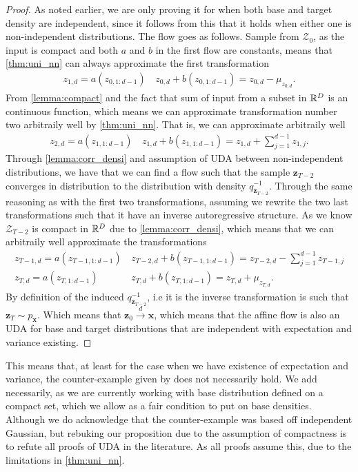 \begin{proof}
    As noted earlier, we are only proving it for when both base and target density are independent, since it follows from this that 
    it holds when either one is non-independent distributions. The flow goes as follows. Sample from \(\mathcal{Z}_0\), as the input
    is compact and both \(a\) and \(b\) in the first flow are constants, means that \cref{thm:uni_nn} can always approximate the
    first transformation
    \begin{align*}
        z_{1,d} = a(z_{0,1:d-1})&\,z_{0,d} + b(z_{0,1:d-1}) = z_{0,d} - \mu_{z_{0,d}}.
    \end{align*}
    From \cref{lemma:compact} and the fact that sum of input from a subset in \(\mathbb{R}^D\) is an continuous function, which means
    we can approximate transformation number two arbitraily well by \cref{thm:uni_nn}. That is, we can approximate 
    arbitraily well 
    \begin{align*}
        z_{2,d} = a(z_{1,1:d-1})&\,z_{1,d} + b(z_{1,1:d-1}) = z_{1,d} + \sum_{j=1}^{d-1} z_{1,j}.
    \end{align*}
    Through \cref{lemma:corr_densi} and assumption of UDA between non-independent distributions, we have that we 
    can find a flow such that the sample \(\bm z_{T-2}\) converges in distribution to the distribution with density \(q_{\bm z_{T-2}}^{-1}\).
    Through the same reasoning as with the first two transformations, assuming we rewrite the
    two last transformations such that it have an inverse autoregressive structure.
    As we know \(\mathcal{Z}_{T-2}\) is compact in \(\mathbb{R}^D\) due to
    \cref{lemma:corr_densi}, which means that we can arbitraily well approximate the transformations
    \begin{align*}
        z_{T-1,d} = a(z_{T-1,1:d-1})&\,z_{T-2,d} + b(z_{T-1,1:d-1}) = z_{T-2,d} - \sum_{j=1}^{d-1} z_{T-1,j}\\
        z_{T,d} = a(z_{T,1:d-1})&\,z_{T,d} + b(z_{T,1:d-1}) = z_{T,d} + \mu_{z_{T,d}}.
    \end{align*}
    By definition of the induced \(q_{\bm z_{T-2}}^{-1}\), i.e it is the inverse transformation is such that 
    \(\bm z_{T} \sim p_{\bm x}\). Which means that \(\bm z_0 \xrightarrow{d} \bm x\), which means that the affine flow
    is also an UDA for base and target distributions that are independent with expectation and variance existing.
\end{proof}
This means that, at least for the case when we have existence of expectation and variance, the counter-example given by \cite{wehenkel}
does not necessarily hold. We add necessarily, as we are currently working with base distribution defined on a compact set, which
we allow as a fair condition to put on base densities. Although we do acknowledge that the counter-example was based off independent
Gaussian, but rebuking our proposition due to the assumption of compactness is to refute all proofs of UDA in the literature. As all
proofs assume this, due to the limitations in \cref{thm:uni_nn}.  

